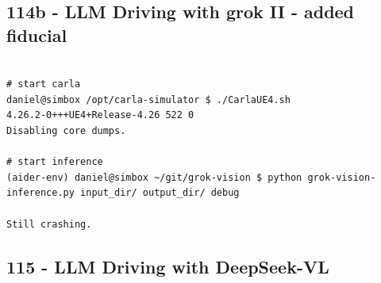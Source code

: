 \subsection{114b - LLM Driving with grok II - added fiducial}
\label{app_res:114b}

\begin{verbatim}

# start carla
daniel@simbox /opt/carla-simulator $ ./CarlaUE4.sh 
4.26.2-0+++UE4+Release-4.26 522 0
Disabling core dumps.

# start inference
(aider-env) daniel@simbox ~/git/grok-vision $ python grok-vision-inference.py input_dir/ output_dir/ debug 

Still crashing.
\end{verbatim}


\subsection{115 - LLM Driving with DeepSeek-VL}
\label{app_res:115}


